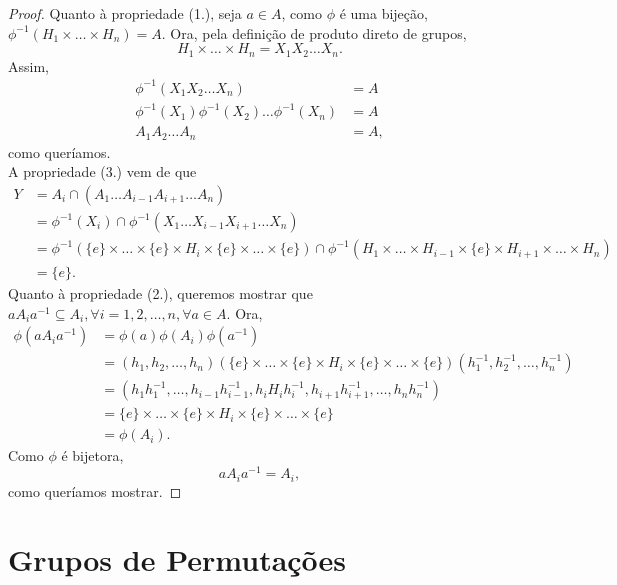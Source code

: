 \documentclass[11pt,openany]{book}
\begin{document}
\begin{proof}
        Quanto à propriedade (1.), seja $a \in A$, como $\phi$ é uma bijeção, $\phi^{-1}(H_1 \times \dots \times H_n) = A$. Ora, pela definição de produto direto de grupos,
        \[H_1 \times \dots \times H_n = X_1 X_2 \dots X_n.\]
        Assim,
        \begin{align*}
            \phi^{-1}(X_1 X_2 \dots X_n) &= A\\
            \phi^{-1}(X_1) \phi^{-1}(X_2) \dots \phi^{-1}(X_n) &= A\\
            A_1 A_2 \dots A_n &= A,
        \end{align*}
        como queríamos.\\
        A propriedade (3.) vem de que
        \begin{align*}
            Y &= A_i \cap (A_1\dots A_{i-1}A_{i+1}\dots A_n)\\
            &= \phi^{-1}(X_i) \cap \phi^{-1}(X_1\dots X_{i-1}X_{i+1}\dots X_n)\\
            &= \phi^{-1}(\{e\} \times \dots \times \{e\} \times H_i \times \{e\} \times \dots \times \{e\}) \cap \phi^{-1}(H_1 \times \dots \times H_{i-1} \times \{e\} \times H_{i+1} \times \dots \times H_n)\\
            &= \{e\}.
        \end{align*}
        Quanto à propriedade (2.), queremos mostrar que $aA_ia^{-1} \subseteq A_i, \forall i = 1, 2, \dots, n, \forall a \in A$.
        Ora,
        \begin{align*}
            \phi(aA_ia^{-1}) &= \phi(a)\phi(A_i)\phi(a^{-1})\\
            &= (h_1, h_2, \dots, h_n) (\{e\} \times \dots \times \{e\} \times H_i \times \{e\} \times \dots \times \{e\}) (h_1^{-1}, h_2^{-1}, \dots, h_n^{-1})\\   
            &= (h_1h_1^{-1}, \dots, h_{i-1}h_{i-1}^{-1}, h_iH_ih_i^{-1}, h_{i+1}h_{i+1}^{-1}, \dots, h_nh_n^{-1})\\
            &= \{e\} \times \dots \times \{e\} \times H_i \times \{e\} \times \dots \times \{e\}\\
            &= \phi(A_i).
        \end{align*}
        Como $\phi$ é bijetora,
        \[aA_ia^{-1} = A_i,\]
        como queríamos mostrar.
    \end{proof}

\chapter{Grupos de Permutações}
\end{document}
